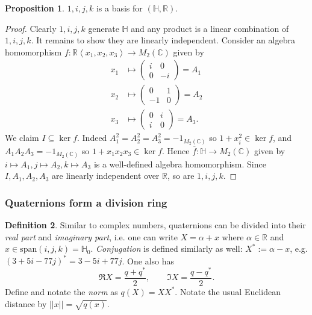 \documentclass[a4paper]{article}
\newcommand{\la}{\left\langle}
\newcommand{\ra}{\right\rangle}
\newcommand{\R}{\mathbb{R}}
\newcommand{\C}{\mathbb{C}}
\newcommand{\Hq}{\mathbb{H}}
\newcommand{\spa}{\text{span}}
\theoremstyle{definition}
\newtheorem{defn}{Definition}[subsection]
\newtheorem{prop}[defn]{Proposition}
\begin{document}
\begin{prop}
$1,i,j,k$ is a basis for $(\Hq,\R)$.
\end{prop}
\begin{proof}
Clearly $1,i,j,k$ generate $\Hq$ and any product is a linear combination of $1,i,j,k$. It remains to show they are linearly independent. Consider an algebra homomorphism $f:\R\la x_1,x_2,x_3\ra\rightarrow M_2(\C)$ given by
\[
\begin{aligned}
x_1 &\mapsto \begin{pmatrix}i&0\\0&-i\end{pmatrix}=A_1 \\
x_2 &\mapsto \begin{pmatrix}0&1\\-1&0\end{pmatrix}=A_2 \\
x_3 &\mapsto \begin{pmatrix}0&i\\i&0\end{pmatrix}=A_3.
\end{aligned}
\]
We claim $I\subseteq \ker f$. Indeed $A_1^2=A_2^2=A_3^2=-1_{M_2(\C)}$ so $1+x_i^2\in\ker f$, and $A_1A_2A_3=-1_{M_2(\C)}$ so $1+x_1x_2x_3\in\ker f$. Hence $\overline f:\Hq\rightarrow M_2(\C)$ given by $i\mapsto A_1,j\mapsto A_2,k\mapsto A_3$ is a well-defined algebra homomorphism. Since $I,A_1,A_2,A_3$ are linearly independent over $\R$, so are $1,i,j,k$.
\end{proof}

\subsubsection{Quaternions form a division ring}
\begin{defn}
Similar to complex numbers, quaternions can be divided into their \textit{real part} and \textit{imaginary part}, i.e. one can write $X=\alpha+x$ where $\alpha\in\R$ and $x\in\spa(i,j,k)=\Hq_0$. \textit{Conjugation} is defined similarly as well: $X^\ast:=\alpha-x$, e.g. $(3+5i-77j)^\ast=3-5i+77j$. One also has
\[
\Re X=\frac{q+q^\ast}2,\qquad \Im X=\frac{q-q^\ast}2.
\]
Define and notate the \textit{norm} as $q(X)=XX^\ast$. Notate the usual Euclidean distance by $||x||=\sqrt{q(x)}$.
\end{defn}
\end{document}
